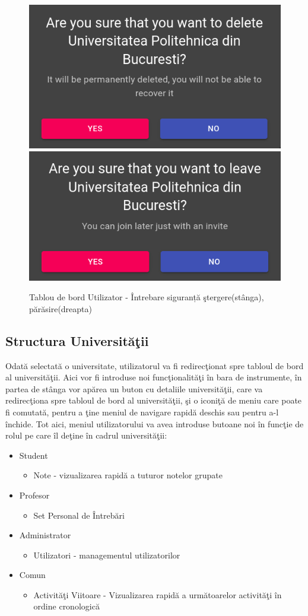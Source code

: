 \documentclass[12pt, a4paper, oneside, romanian]{teza-upb}
\begin{document}
\begin{figure}[H]
\centering
\includegraphics*[width=0.45\columnwidth]{tablou-de-bord-utilizator-intrebare-siguranta-stergere}
\includegraphics*[width=0.45\columnwidth]{tablou-de-bord-utilizator-intrebare-siguranta-parasire}
\caption{Tablou de bord Utilizator - Întrebare siguranță ştergere(stânga), părăsire(dreapta)}
\label{tablou-de-bord-utilizator-intrebare-siguranta}
\end{figure}

\subsection{Structura Universităţii}

Odată selectată o universitate, utilizatorul va fi redirecţionat spre tabloul de bord al universităţii. Aici vor fi introduse noi funcţionalităţi în bara de instrumente, în partea de stânga vor apărea un buton cu detaliile universităţii, care va redirecţiona spre tabloul de bord al universităţii, şi o iconiţă de meniu care poate fi comutată, pentru a ţine meniul de navigare rapidă deschis sau pentru a-l închide. Tot aici, meniul utilizatorului va avea introduse butoane noi în funcţie de rolul pe care îl deţine în cadrul universităţii:
\begin{itemize}
	\item Student
		\begin{itemize}
			\item Note - vizualizarea rapidă a tuturor notelor grupate
		\end{itemize}
	\item Profesor
		\begin{itemize}
			\item Set Personal de Întrebări
		\end{itemize}
	\item Administrator
		\begin{itemize}
			\item Utilizatori - managementul utilizatorilor
		\end{itemize}
	\item Comun
		\begin{itemize}
			\item Activităţi Viitoare - Vizualizarea rapidă a următoarelor activităţi în ordine cronologică
		\end{itemize}
\end{itemize}
\end{document}
